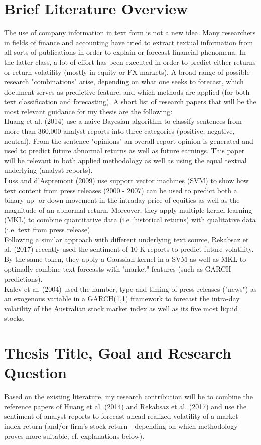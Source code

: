 \documentclass[12pt, a4paper]{article}
\author{Kevin Tikvic}
\begin{document}
\section*{Brief Literature Overview}
The use of company information in text form is not a new idea. Many researchers in fields of finance and accounting have tried to extract textual information from all sorts of publications in order to explain or forecast financial phenomena. In the latter class, a lot of effort has been executed in order to predict either returns or return volatility (mostly in equity or FX markets). A broad range of possible research "combinations" arise, depending on what one seeks to forecast, which document serves as predictive feature, and which methods are applied (for both text classification and forecasting). A short list of research papers that will be the most relevant guidance for my thesis are the following: 
\\ \newline
Huang et al. (2014) use a naive Bayesian algorithm to classify sentences from more than 360,000 analyst reports into three categories (positive, negative, neutral). From the sentence "opinions" an overall report opinion is generated and used to predict future abnormal returns as well as future earnings. This paper will be relevant in both applied methodology as well as using the equal textual underlying (analyst reports).
\\
Luss and d'Aspremont (2009) use support vector machines (SVM) to show how text content from press releases (2000 - 2007) can be used to predict both a binary up- or down movement in the intraday price of equities as well as the magnitude of an abnormal return. Moreover, they apply multiple kernel learning (MKL) to combine quantitative data (i.e. historical returns) with qualitative data (i.e. text from press release).
\\ 
Following a similar approach with different underlying text source, Rekabsaz et al. (2017) recently used the sentiment of 10-K reports to predict future volatility. By the same token, they apply a Gaussian kernel in a SVM as well as MKL to optimally combine text forecasts with "market" features (such as GARCH predictions).
\\
Kalev et al. (2004) used the number, type and timing of press releases ("news") as an exogenous variable in a GARCH(1,1) framework to forecast the intra-day volatility of the Australian stock market index as well as its five most liquid stocks.

\section*{Thesis Title, Goal and Research Question}
Based on the existing literature, my research contribution will be to combine the reference papers of Huang et al. (2014) and Rekabsaz et al. (2017) and use the sentiment of analyst reports to forecast ahead realized volatility of a market index return (and/or firm's stock return - depending on which methodology proves more suitable, cf. explanations below). 
\end{document}
